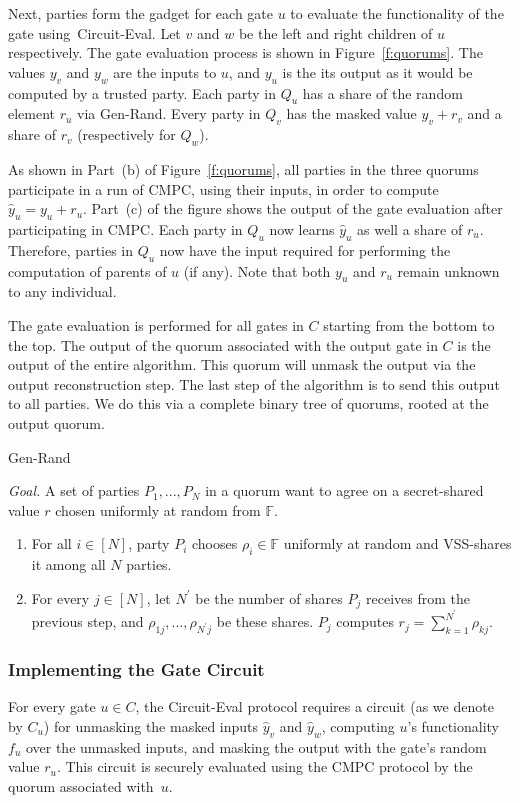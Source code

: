 \documentclass[11pt,letter]{article}
\newcommand{\alg}[1]{\mbox{\textsf{#1}}}
\newcommand{\mask}[1]{\widehat{#1}}
\newcommand{\F}{\mathbb{F}}
\theoremstyle{mytheoremstyle}
\let\savedCaption=\caption
\renewcommand*{\caption}[1]{\savedCaption[#1]{~#1}}
\newcommand{\algfont}{}
\newcommand{\hw}{\mbox{\textsf{CMPC}}\xspace}
\newcommand{\ce}{\textsf{Circuit-Eval}\xspace}
\begin{document}
Next, parties form the gadget for each gate $u$ to evaluate the functionality of the gate using~\ce. Let $v$ and $w$ be the left and right children of $u$ respectively. The gate evaluation process is shown in Figure~\ref{f:quorums}. The values $y_v$ and $y_w$ are the inputs to $u$, and $y_u$ is the its output as it would be computed by a trusted party. Each party in $Q_u$ has a share of the random element $r_u$ via \alg{Gen-Rand}. Every party in $Q_v$ has the masked value $y_v + r_v$ and a share of $r_v$ (respectively for $Q_w$). 

As shown in Part~(b) of Figure~\ref{f:quorums}, all parties in the three quorums participate in a run of \hw, using their inputs, in order to compute $\mask{y}_u = y_u + r_u$. Part~(c) of the figure shows the output of the gate evaluation after participating in \hw. Each party in $Q_u$ now learns $\mask{y}_u$ as well a share of $r_u$. Therefore, parties in $Q_u$ now have the input required for performing the computation of parents of $u$ (if any). Note that both $y_u$ and $r_u$ remain unknown to any individual.

The gate evaluation is performed for all gates in $C$ starting from the bottom to the top. The output of the quorum associated with the output gate in $C$ is the output of the entire algorithm. This quorum will unmask the output via the output reconstruction step. The last step of the algorithm is to send this output to all parties. We do this via a complete binary tree of quorums, rooted at the output quorum.
\begin{algorithm}
	\caption{\alg{Gen-Rand}} \label{pro:GenRand}
	\medskip
	\algfont
	\textit{Goal.} A set of parties $P_1,...,P_N$ in a quorum want to agree on a secret-shared value $r$ chosen uniformly at random from $\F$.
	
	\begin{enumerate}
		\item For all $i\in[N]$, party $P_i$ chooses $\rho_i \in \mathbb{F}$ uniformly at random and VSS-shares it among all $N$ parties.
		\item For every $j\in[N]$, let $N^\prime$ be the number of shares $P_j$ receives from the previous step, and $\rho_{1j},...,\rho_{N^\prime j}$ be these shares. $P_j$ computes $r_j=\sum_{k=1}^{N^\prime}\rho_{kj}$.	
	\end{enumerate}
\end{algorithm}


\subsubsection{Implementing the Gate Circuit} 
For every gate $u \in C$, the \alg{Circuit-Eval} protocol requires a circuit (as we denote by $C_u$) for unmasking the masked inputs $\mask{y}_v$ and $\mask{y}_w$, computing $u$'s functionality $f_u$ over the unmasked inputs, and masking the output with the gate's random value $r_u$. This circuit is securely evaluated using the \alg{CMPC} protocol by the quorum associated with~$u$. 
\end{document}
